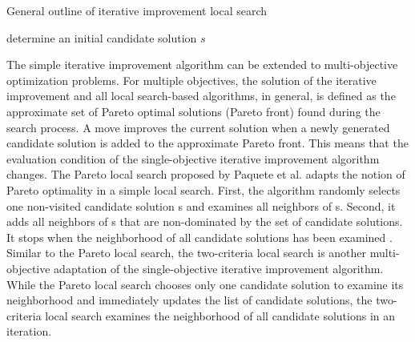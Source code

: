  \begin{algorithm}
  \caption{General outline of iterative improvement local search}\label{alg:iterative-improvement}
    determine an initial candidate solution $s$
    
  \end{algorithm}
  
The simple iterative improvement algorithm can be extended to multi-objective optimization problems. For multiple objectives, the solution of the iterative improvement and all local search-based algorithms, in general, is defined as the approximate set of Pareto optimal solutions (Pareto front) found during the search process. A move improves the current solution when a newly generated candidate solution is added to the approximate Pareto front. This means that the evaluation condition of the single-objective iterative improvement algorithm changes. The Pareto local search proposed by Paquete et al. \parencite{Paquete2004ParetoStudy} adapts the notion of Pareto optimality in a simple local search. First, the algorithm randomly selects one non-visited candidate solution s and examines all neighbors of s. Second, it adds all neighbors of s that are non-dominated by the set of candidate solutions. It stops when the neighborhood of all candidate solutions has been examined \parencite{Gonzalez2007HandbookMetaheuristics}. Similar to the Pareto local search, the two-criteria local search \parencite{Angel2004ApproximatingProblem} is another multi-objective adaptation of the single-objective iterative improvement algorithm. While the Pareto local search chooses only one candidate solution to examine its neighborhood and immediately updates the list of candidate solutions, the two-criteria local search examines the neighborhood of all candidate solutions in an iteration.



   
